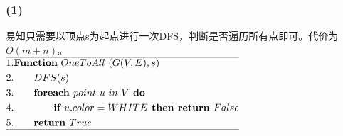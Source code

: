 \documentclass[11pt,a4paper,oneside,oldfontcommands]{ctexart}
\begin{document}
\hypertarget{4.17(1)}{\subsubsection*{(1)}}
\noindent 易知只需要以顶点s为起点进行一次DFS，判断是否遍历所有点即可。代价为$O(m+n)$。\\
$\begin{aligned}
		\hline
		 & 1.\textbf{Function}\ {OneToAll}\ (G(V,E),s)                         \\
		 & 2.\hspace{20pt}DFS(s)                                               \\
		 & 3.\hspace*{20pt}\textbf{foreach }point\ u\ in\ V\textbf{ do}        \\
		 & 4.\hspace{40pt}\textbf{if }u.color=WHITE\textbf{ then return }False \\
		 & 5.\hspace*{20pt}\textbf{return }True                                \\
		\hline
	\end{aligned}$
\end{document}
